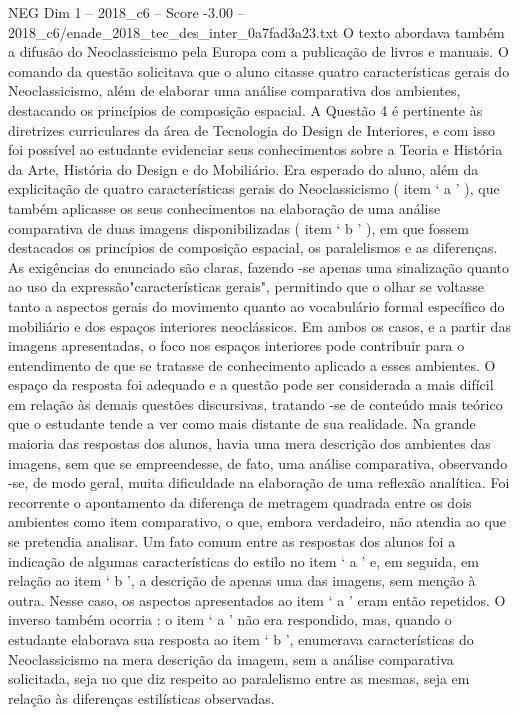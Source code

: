 \begin{textsample}{NEG Dim 1 – 2018\_c6 – Score -3.00 – 2018\_c6/enade\_2018\_tec\_des\_inter\_0a7fad3a23.txt}
O texto abordava também a difusão do Neoclassicismo pela Europa com a publicação de livros e manuais.
O comando da questão solicitava que o aluno citasse quatro características gerais do Neoclassicismo, além de elaborar uma análise comparativa dos ambientes, destacando os princípios de composição espacial.
A Questão 4 é pertinente às diretrizes curriculares da área de Tecnologia do Design de Interiores, e com isso foi possível ao estudante evidenciar seus conhecimentos sobre a Teoria e História da Arte, História do Design e do Mobiliário.
Era esperado do aluno, além da explicitação de quatro características gerais do Neoclassicismo ( item ‘ a ’ ), que também aplicasse os seus conhecimentos na elaboração de uma análise comparativa de duas imagens disponibilizadas ( item ‘ b ’ ), em que fossem destacados os princípios de composição espacial, os paralelismos e as diferenças.
As exigências do enunciado são claras, fazendo -se apenas uma sinalização quanto ao uso da expressão"características gerais", permitindo que o olhar se voltasse tanto a aspectos gerais do movimento quanto ao vocabulário formal específico do mobiliário e dos espaços interiores neoclássicos.
Em ambos os casos, e a partir das imagens apresentadas, o foco nos espaços interiores pode contribuir para o entendimento de que se tratasse de conhecimento aplicado a esses ambientes.
O espaço da resposta foi adequado e a questão pode ser considerada a mais difícil em relação às demais questões discursivas, tratando -se de conteúdo mais teórico que o estudante tende a ver como mais distante de sua realidade.
Na grande maioria das respostas dos alunos, havia uma mera descrição dos ambientes das imagens, sem que se empreendesse, de fato, uma análise comparativa, observando -se, de modo geral, muita dificuldade na elaboração de uma reflexão analítica.
Foi recorrente o apontamento da diferença de metragem quadrada entre os dois ambientes como item comparativo, o que, embora verdadeiro, não atendia ao que se pretendia analisar.
Um fato comum entre as respostas dos alunos foi a indicação de algumas características do estilo no item ‘ a ’ e, em seguida, em relação ao item ‘ b ’, a descrição de apenas uma das imagens, sem menção à outra.
Nesse caso, os aspectos apresentados ao item ‘ a ’ eram então repetidos.
O inverso também ocorria : o item ‘ a ’ não era respondido, mas, quando o estudante elaborava sua resposta ao item ‘ b ’, enumerava características do Neoclassicismo na mera descrição da imagem, sem a análise comparativa solicitada, seja no que diz respeito ao paralelismo entre as mesmas, seja em relação às diferenças estilísticas observadas.

\end{textsample}
